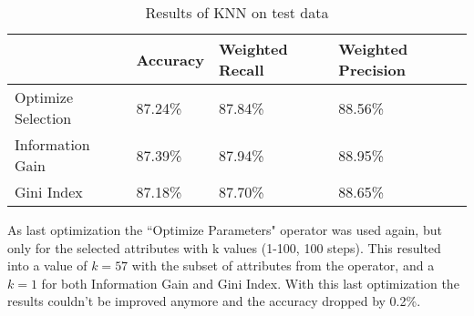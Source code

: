 \begin{table}[h]
\begin{tabular}{@{}llll@{}}
\hline
                                        & Accuracy & Weighted Recall & Weighted Precision \\ \hline
\multicolumn{1}{l|}{Optimize Selection} & 87.24\%  & 87.84\%         & 88.56\%            \\
\multicolumn{1}{l|}{Information Gain}          & 87.39\%  & 87.94\%         & 88.95\%            \\
\multicolumn{1}{l|}{Gini Index}         & 87.18\%  & 87.70\%         & 88.65\%            \\ \hline
\end{tabular}
\label{Tab:KNNResults}
\caption{Results of KNN on test data}
\end{table}

As last optimization the ``Optimize Parameters" operator was used again, but only for the selected attributes with k values (1-100, 100 steps). This resulted into a value of $k = 57$ with the subset of attributes from the operator, and a $k = 1$ for both Information Gain and Gini Index. With this last optimization the results couldn't be improved anymore and the accuracy dropped by 0.2\%.
